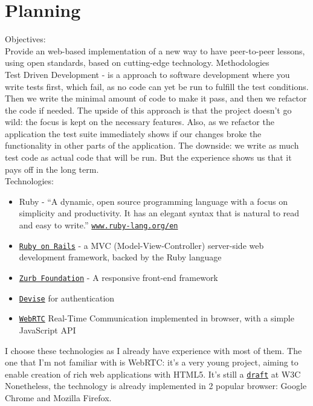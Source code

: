 \section{Planning}
Objectives:\\
Provide an web-based implementation of a new way to have peer-to-peer lessons, using open standards, based on cutting-edge technology.
Methodologies\\
Test Driven Development - is a approach to software development where you write tests first, which fail, as no code can yet be run to fulfill
the test conditions. Then we write the minimal amount of code to make it pass, and then we refactor the code if needed.
The upside of this approach is that the project doesn't go wild: the focus is kept on the necessary features. Also, as we refactor the application
the test suite immediately shows if our changes broke the functionality in other parts of the application.
The downside: we write as much test code as actual code that will be run. But the experience shows us that it pays off in the long term.\\
Technologies:
\begin{itemize}
    \item Ruby - ``A dynamic, open source programming language with a focus on simplicity and productivity.
        It has an elegant syntax that is natural to read and easy to write.'' \href{https://wwww.ruby-lang.org/en/}{\texttt{www.ruby-lang.org/en}}
    \item \href{http://rubyonrails.org}{\texttt{Ruby on Rails}} - a MVC (Model-View-Controller) server-side web development framework, backed by the Ruby language
    \item \href{http://foundation.zurb.com/}{\texttt{Zurb Foundation}} - A responsive front-end framework
    \item \href{https://github.com/plataformatec/devise}{\texttt{Devise}} for authentication
    \item \href{http://www.webrtc.org/}{\texttt{WebRTC}} Real-Time Communication implemented in browser, with a simple JavaScript API
\end{itemize}
I choose these technologies as I already have experience with most of them. The one that I'm not familiar with is WebRTC:
it's a very young project, aiming to enable creation of rich web applications with HTML5. It's still a \href{http://dev.w3.org/2011/webrtc/editor/webrtc.html}{\texttt{draft}} at W3C
Nonetheless, the technology is already implemented in 2 popular browser: Google Chrome and Mozilla Firefox.
